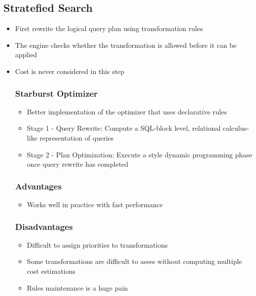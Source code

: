 \documentclass[11pt]{article}
\begin{document}
    \subsection*{Stratefied Search}
    \begin{itemize}
        \item First rewrite the logical query plan using transformation rules
        \item The engine checks whether the transformation is allowed before it can be applied
        \item Cost is never considered in this step

        \subsubsection*{Starburst Optimizer~\cite{p18-lohman}}
        \begin{itemize}
            \item Better implementation of the  optimizer that uses declarative rules
            \item Stage 1 - Query Rewrite: Compute a SQL-block level, relational calculus-like representation of queries
            \item Stage 2 - Plan Optimization: Execute a  style dynamic programming phase once query rewrite has completed

        \end{itemize}

        \subsubsection*{Advantages}
        \begin{itemize}
            \item Works well in practice with fast performance
        \end{itemize}

        \subsubsection*{Disadvantages}
        \begin{itemize}
            \item Difficult to assign priorities to transformations
            \item Some transformations are difficult to asses without computing multiple cost estimations
            \item Rules maintenance is a huge pain
        \end{itemize}
    \end{itemize}
\end{document}
